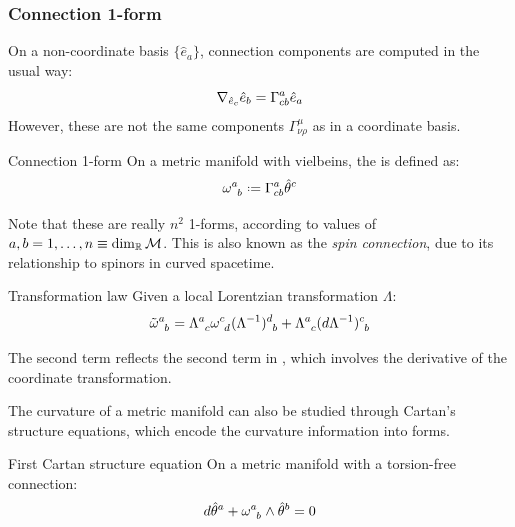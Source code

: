 \subsubsection{Connection 1-form}

On a non-coordinate basis $ \{\hat{e}_a\} $, connection components are computed in the usual way:
\begin{equation}
  \nabla_{\hat{e}_c} \hat{e}_b = \Gamma^a_{cb} \hat{e}_a
  \label{eq:connection-vielbeins}
\end{equation}
However, these are not the same components $ \Gamma^\mu_{\nu \rho} $ as in a coordinate basis.

\begin{definition}{Connection 1-form}{}
  On a metric manifold with vielbeins, the  is defined as:
  \begin{equation}
    \tensor{\omega}{^a_b} \defeq \Gamma^a_{cb} \hat{\theta}^c
    \label{eq:connection-1-form}
  \end{equation}
\end{definition}

Note that these are really $ n^2 $ 1-forms, according to values of $ a,b = 1, \dots, n \equiv \dim_{\mathbb{R}} \mathcal{M} $. This is also known as the \textit{spin connection}, due to its relationship to spinors in curved spacetime.

\begin{proposition}{Transformation law}{}
  Given a local Lorentzian transformation $ \Lambda $:
  \begin{equation}
    \tensor{\tilde{\omega}}{^a_b} = \tensor{\Lambda}{^a_c} \tensor{\omega}{^c_d} \tensor{(\Lambda^{-1})}{^d_b} + \tensor{\Lambda}{^a_c} \tensor{(d\Lambda^{-1})}{^c_b}
  \end{equation}
\end{proposition}

The second term reflects the second term in , which involves the derivative of the coordinate transformation.

The curvature of a metric manifold can also be studied through Cartan's structure equations, which encode the curvature information into forms.

\begin{theorem}{First Cartan structure equation}{}
  On a metric manifold with a torsion-free connection:
  \begin{equation}
    d\hat{\theta}^a + \tensor{\omega}{^a_b} \wedge \hat{\theta}^b = 0
    \label{eq:first-cartan-stru-eq}
  \end{equation}
\end{theorem}

